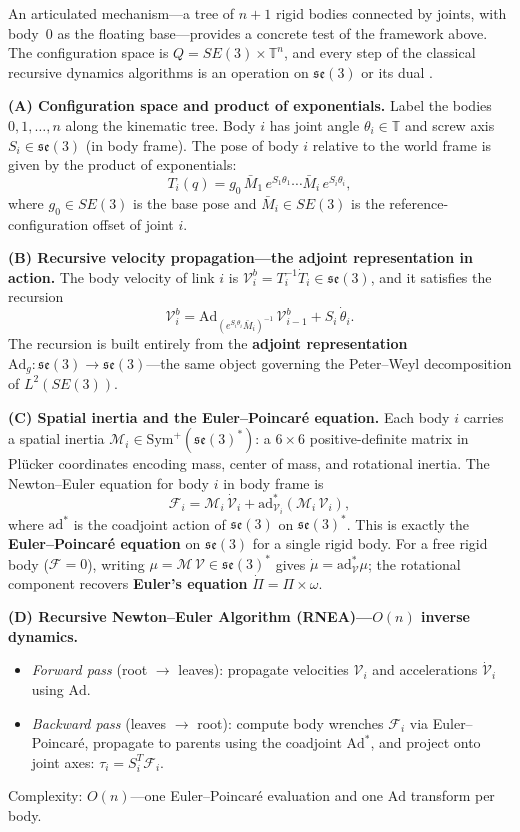 \documentclass[12pt]{amsart}
\theoremstyle{definition}
\theoremstyle{remark}
\newcommand{\bT}{\mathbb{T}}
\newcommand{\cM}{\mathcal{M}}
\begin{document}
An articulated mechanism---a tree of $n+1$ rigid bodies connected by joints,
with body~$0$ as the floating base---provides a concrete test of the framework
above.
The configuration space is $Q = SE(3) \times \bT^n$, and every step of the classical recursive
dynamics algorithms is an operation on $\mathfrak{se}(3)$ or its dual
\cite{Featherstone,MurrayLiSastry}.

\medskip\noindent\textbf{(A) Configuration space and product of exponentials.}
Label the bodies $0, 1, \ldots, n$ along the kinematic tree.
Body $i$ has joint angle $\theta_i \in \bT$ and screw axis
$S_i \in \mathfrak{se}(3)$ (in body frame).
The pose of body $i$ relative to the world frame is given by the product of
exponentials:
\[
T_i(q)
= g_0 \, \bar{M}_1 \, e^{S_1 \theta_1} \cdots \bar{M}_i \, e^{S_i \theta_i},
\]
where $g_0 \in SE(3)$ is the base pose and
$\bar{M}_i \in SE(3)$ is the reference-configuration offset of joint $i$.

\medskip\noindent\textbf{(B) Recursive velocity propagation---the adjoint
representation in action.}
The body velocity of link $i$ is
$\mathcal{V}_i^b = T_i^{-1}\dot{T}_i \in \mathfrak{se}(3)$, and it
satisfies the recursion
\[
\mathcal{V}_i^b
= \mathrm{Ad}_{(e^{S_i\theta_i}\bar{M}_i)^{-1}}\,\mathcal{V}_{i-1}^b
  + S_i\,\dot{\theta}_i.
\]
The recursion is built entirely from the \textbf{adjoint representation}
$\mathrm{Ad}_g : \mathfrak{se}(3) \to \mathfrak{se}(3)$---the same object
governing the Peter--Weyl decomposition of $L^2(SE(3))$.

\medskip\noindent\textbf{(C) Spatial inertia and the Euler--Poincar\'e
equation.}
Each body $i$ carries a spatial inertia
$\cM_i \in \mathrm{Sym}^+(\mathfrak{se}(3)^*)$: a $6 \times 6$
positive-definite matrix in Pl\"ucker coordinates encoding mass, center of
mass, and rotational inertia.
The Newton--Euler equation for body $i$ in body frame is
\[
\mathcal{F}_i
= \cM_i\,\dot{\mathcal{V}}_i
  + \mathrm{ad}^*_{\mathcal{V}_i}\!(\cM_i\,\mathcal{V}_i),
\]
where $\mathrm{ad}^*$ is the coadjoint action of $\mathfrak{se}(3)$ on
$\mathfrak{se}(3)^*$.
This is exactly the \textbf{Euler--Poincar\'e equation} on $\mathfrak{se}(3)$
for a single rigid body.
For a free rigid body ($\mathcal{F} = 0$), writing
$\mu = \cM\,\mathcal{V} \in \mathfrak{se}(3)^*$ gives
$\dot{\mu} = \mathrm{ad}^*_{\mathcal{V}}\mu$; the rotational component
recovers \textbf{Euler's equation} $\dot{\Pi} = \Pi \times \omega$.

\medskip\noindent\textbf{(D) Recursive Newton--Euler Algorithm
(RNEA)---$O(n)$ inverse dynamics.}
\begin{itemize}[nosep]
\item \emph{Forward pass} (root $\to$ leaves): propagate velocities
  $\mathcal{V}_i$ and accelerations $\dot{\mathcal{V}}_i$ using $\mathrm{Ad}$.
\item \emph{Backward pass} (leaves $\to$ root): compute body wrenches
  $\mathcal{F}_i$ via Euler--Poincar\'e, propagate to parents using the
  coadjoint $\mathrm{Ad}^*$, and project onto joint axes:
  $\tau_i = S_i^T \mathcal{F}_i$.
\end{itemize}
Complexity: $O(n)$---one Euler--Poincar\'e evaluation and one $\mathrm{Ad}$
transform per body.
\end{document}
